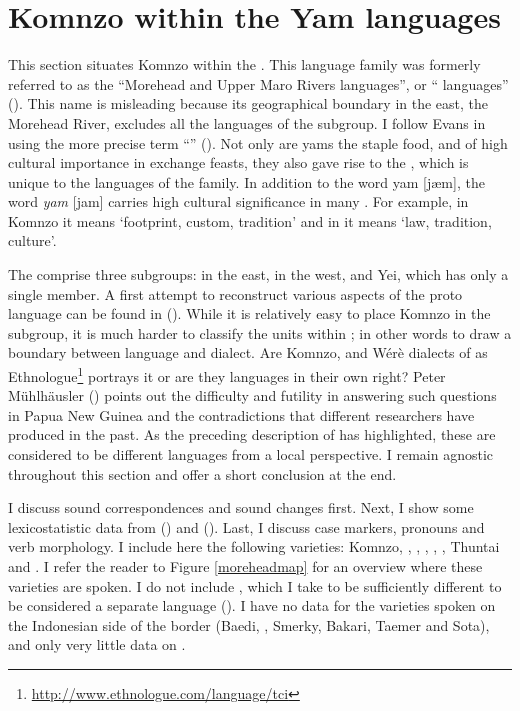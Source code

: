 \section{Komnzo within the Yam languages}\label{Komnzowithinyam}

This section situates Komnzo within the . This language family was formerly referred to as the ``Morehead and Upper Maro Rivers languages'', or `` languages'' (\citealt{Wurm:1971uw}). This name is misleading because its geographical boundary in the east, the Morehead River, excludes all the languages of the  subgroup. I follow Evans in using the more precise term ``'' (\citeyear[124]{Evans:2012wp}). Not only are yams the staple food, and of high cultural importance in exchange feasts, they also gave rise to the  , which is unique to the languages of the family. In addition to the  word yam [jæm], the word \emph{yam} [jam] carries high cultural significance in many . For example, in Komnzo it means `footprint, custom, tradition' and in  it means `law, tradition, culture'.%

The  comprise three subgroups:  in the east,  in the west, and Yei, which has only a single member. A first attempt to reconstruct various aspects of the proto language can be found in (\citealt{Evans:sng}). While it is relatively easy to place Komnzo in the  subgroup, it is much harder to classify the units within ; in other words to draw a boundary between language and dialect. Are Komnzo,  and Wérè dialects of  as Ethnologue\footnote{\url{http://www.ethnologue.com/language/tci}} portrays it or are they languages in their own right? Peter Mühlhäusler (\citeyear{Muhlhausler:2006naming}) points out the difficulty and futility in answering such questions in Papua New Guinea and the contradictions that different researchers have produced in the past. As the preceding description of  has highlighted, these are considered to be different languages from a local perspective. I remain agnostic throughout this section and offer a short conclusion at the end.%

I discuss sound correspondences and sound changes first. Next, I show some lexicostatistic data from (\citealt{Wurm:1971uw}) and (\citealt{Clifton:1991fly}). Last, I discuss case markers, pronouns and verb morphology. I include here the following  varieties: Komnzo, , , , , ,  Thuntai and . I refer the reader to Figure \ref{moreheadmap} for an overview where these varieties are spoken. I do not include , which I take to be sufficiently different to be considered a separate language (\citealt{Bouve:2003ar}). I have no data for the  varieties spoken on the Indonesian side of the border (Baedi, , Smerky, Bakari, Taemer and Sota), and only very little data on .%

